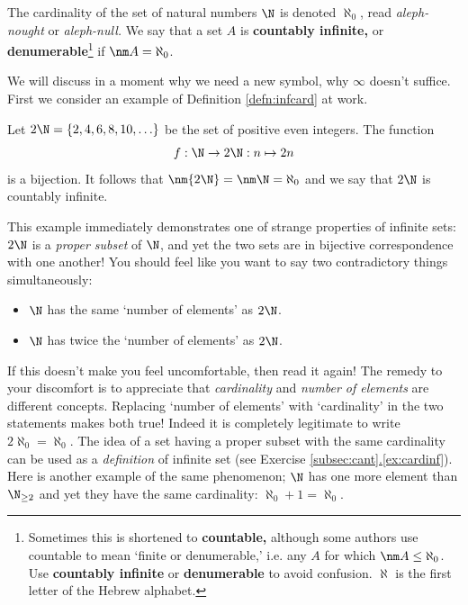 \begin{defn}
The cardinality of the set of natural numbers $\N$ is denoted $\aleph_0$, read \emph{aleph-nought} or \emph{aleph-null.} We say that a set $A$ is \textbf{countably infinite,} or \textbf{denumerable}\footnote{Sometimes this is shortened to \textbf{countable,} although some authors use countable to mean `finite or denumerable,' i.e. any $A$ for which $\nm A\le\aleph_0$. Use \textbf{countably infinite} or \textbf{denumerable} to avoid confusion. $\aleph$ is the first letter of the Hebrew alphabet.} if $\nm A=\aleph_0$.
\end{defn}

\noindent We will discuss in a moment why we need a new symbol, why $\infty$ doesn't suffice. First we consider an example of Definition \ref{defn:infcard} at work.

\begin{example}
Let $2\N=\{2,4,6,8,10,\ldots\}$ be the set of positive even integers. The function
\[f:\N\to 2\N:n\mapsto 2n\]
is a bijection. It follows that $\nm{2\N}=\nm\N=\aleph_0$ and we say that $2\N$ is countably infinite.
\end{example}

\noindent This example immediately demonstrates one of strange properties of infinite sets: $2\N$ is a \emph{proper subset} of $\N$, and yet the two sets are in bijective correspondence with one another! You should feel like you want to say two contradictory things simultaneously:
\begin{itemize}
  \item $\N$ has the same `number of elements' as $2\N$.
  \item $\N$ has twice the `number of elements' as $2\N$.
\end{itemize}
If this doesn't make you feel uncomfortable, then read it again! The remedy to your discomfort is to appreciate that \emph{cardinality} and \emph{number of elements} are different concepts. Replacing `number of elements' with `cardinality' in the two statements makes both true! Indeed it is completely legitimate to write $2\aleph_0=\aleph_0$. The idea of a set having a proper subset with the same cardinality can be used as a \emph{definition} of infinite set (see Exercise \hyperref[ex:cardinf]{\ref*{subsec:cant}.\ref*{ex:cardinf}}).\\

Here is another example of the same phenomenon; $\N$ has one more element than $\N_{\ge 2}$ and yet they have the same cardinality: $\aleph_0+1=\aleph_0$.

